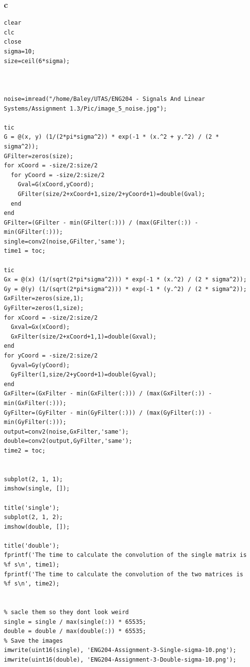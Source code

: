 \documentclass[11pt]{article}
\begin{document}
\subsubsection{c}
\label{sec:org23d8cee}
\begin{verbatim}
clear
clc
close
sigma=10;
size=ceil(6*sigma);



noise=imread("/home/Baley/UTAS/ENG204 - Signals And Linear Systems/Assignment 1.3/Pic/image_5_noise.jpg");

tic
G = @(x, y) (1/(2*pi*sigma^2)) * exp(-1 * (x.^2 + y.^2) / (2 * sigma^2));
GFilter=zeros(size);
for xCoord = -size/2:size/2
  for yCoord = -size/2:size/2
    Gval=G(xCoord,yCoord);
    GFilter(size/2+xCoord+1,size/2+yCoord+1)=double(Gval);
  end
end
GFilter=(GFilter - min(GFilter(:))) / (max(GFilter(:)) - min(GFilter(:)));
single=conv2(noise,GFilter,'same');
time1 = toc;

tic
Gx = @(x) (1/(sqrt(2*pi*sigma^2))) * exp(-1 * (x.^2) / (2 * sigma^2));
Gy = @(y) (1/(sqrt(2*pi*sigma^2))) * exp(-1 * (y.^2) / (2 * sigma^2));
GxFilter=zeros(size,1);
GyFilter=zeros(1,size);
for xCoord = -size/2:size/2
  Gxval=Gx(xCoord);
  GxFilter(size/2+xCoord+1,1)=double(Gxval);
end
for yCoord = -size/2:size/2
  Gyval=Gy(yCoord);
  GyFilter(1,size/2+yCoord+1)=double(Gyval);
end
GxFilter=(GxFilter - min(GxFilter(:))) / (max(GxFilter(:)) - min(GxFilter(:)));
GyFilter=(GyFilter - min(GyFilter(:))) / (max(GyFilter(:)) - min(GyFilter(:)));
output=conv2(noise,GxFilter,'same');
double=conv2(output,GyFilter,'same');
time2 = toc;


subplot(2, 1, 1);
imshow(single, []);

title('single');
subplot(2, 1, 2);
imshow(double, []);

title('double');
fprintf('The time to calculate the convolution of the single matrix is %f s\n', time1);
fprintf('The time to calculate the convolution of the two matrices is %f s\n', time2);


% sacle them so they dont look weird
single = single / max(single(:)) * 65535;
double = double / max(double(:)) * 65535;
% Save the images
imwrite(uint16(single), 'ENG204-Assignment-3-Single-sigma-10.png');
imwrite(uint16(double), 'ENG204-Assignment-3-Double-sigma-10.png');
\end{verbatim}
\end{document}
